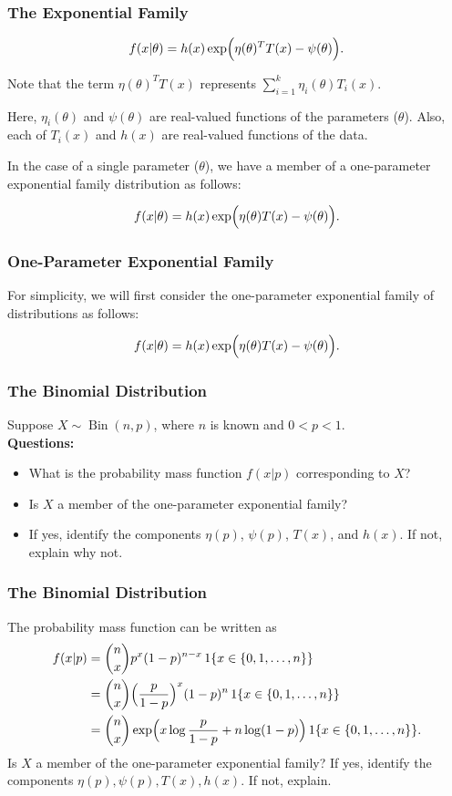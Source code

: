 \documentclass{beamer}
\begin{document}
\begin{frame}
\frametitle{The Exponential Family}

\[
f(x|\theta) = h(x)\exp\Bigl(\eta(\theta)^T T(x) - \psi(\theta)\Bigr).
\]

Note that the term $\eta(\theta)^T T(x)$ represents 
$
  \sum_{i=1}^k \eta_i(\theta) T_i(x).
$
\vspace*{1em}

Here, $\eta_i(\theta)$ and $\psi(\theta)$ are real-valued functions of the parameters ($\theta$). 
Also, each of $T_i(x)$ and $h(x)$ are real-valued functions of the data.

\vspace*{1em}

In the case of a single parameter ($\theta$), we have a member of a one-parameter exponential family distribution as follows:

\[
f(x|\theta) = h(x)\exp\Bigl(\eta(\theta) T(x) - \psi(\theta)\Bigr).
\]
\end{frame}

\begin{frame}
\frametitle{One-Parameter Exponential Family}

For simplicity, we will first consider the one-parameter exponential family of distributions as follows:

\[
f(x|\theta) = h(x)\exp\Bigl(\eta(\theta) T(x) - \psi(\theta)\Bigr).
\]
\end{frame}

\begin{frame}
\frametitle{The Binomial Distribution}
Suppose $X \sim \operatorname{Bin}(n,p)$, where $n$ is known and $0 < p < 1$.\\[1em]
\textbf{Questions:}
\begin{itemize}
  \item What is the probability mass function $f(x|p)$ corresponding to $X$?
  \item Is $X$ a member of the one-parameter exponential family?
  \item If yes, identify the components $\eta(p)$, $\psi(p)$, $T(x)$, and $h(x)$. If not, explain why not.
\end{itemize}
\end{frame}

\begin{frame}
\frametitle{The Binomial Distribution}
The probability mass function can be written as
\begin{align}
f(x|p) &= \binom{n}{x} p^x (1-p)^{n-x} \, 1\{x \in \{0,1,\dots,n\}\} \\
&=  \binom{n}{x}  \Big(\frac{p}{1-p}\Big)^x (1-p)^n \, 1\{x \in \{0,1,\dots,n\}\} \\
& = \binom{n}{x} \exp\Bigl( x\log\frac{p}{1-p} + n\log(1-p) \Bigr) \, 1\{x \in \{0,1,\dots,n\}\}.
\end{align}
Is $X$ a member of the one-parameter exponential family? If yes, identify the components $\eta(p), \psi(p), T(x), h(x).$ If not, explain. 
\end{frame}
\end{document}
